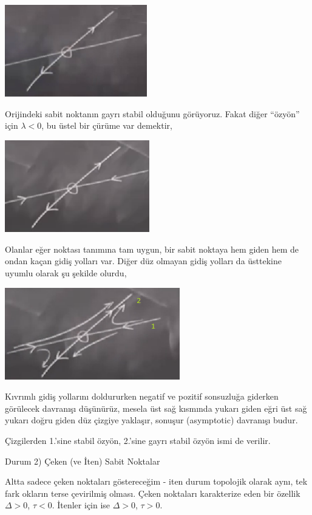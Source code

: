 \documentclass[12pt,fleqn]{article}\usepackage{../../common}
\begin{document}
\includegraphics[height=4cm]{05_08.png}

Orijindeki sabit noktanın gayrı stabil olduğunu görüyoruz. Fakat diğer ``özyön''
için $\lambda < 0$, bu üstel bir çürüme var demektir, 

\includegraphics[height=4cm]{05_09.png}

Olanlar eğer noktası tanımına tam uygun, bir sabit noktaya hem giden hem de
ondan kaçan gidiş yolları var. Diğer düz olmayan gidiş yolları da üsttekine
uyumlu olarak şu şekilde olurdu,

\includegraphics[height=4cm]{05_10.png}

Kıvrımlı gidiş yollarını doldururken negatif ve pozitif sonsuzluğa giderken
görülecek davranışı düşünürüz, mesela üst sağ kısmında yukarı giden eğri üst sağ
yukarı doğru giden düz çizgiye yaklaşır, sonuşur (asymptotic) davranışı budur. 

Çizgilerden 1.'sine stabil özyön, 2.'sine gayrı stabil özyön ismi de verilir. 

Durum 2) Çeken (ve İten) Sabit Noktalar

Altta sadece çeken noktaları göstereceğim - iten durum topolojik olarak aynı,
tek fark okların terse çevirilmiş olması. Çeken noktaları karakterize eden bir
özellik $\Delta > 0$, $\tau < 0$. İtenler için ise $\Delta > 0$, $\tau > 0$.
\end{document}
